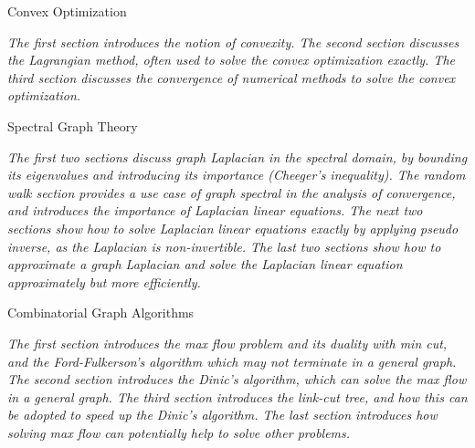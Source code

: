 \documentclass[11pt,landscape,a4paper]{article}
\newcommand{\HEADER}[1]{\begin{tcolorbox}
    \centering
    #1
\end{tcolorbox}}
\begin{document}
\small
\begin{multicols*}{3}


\HEADER{Convex Optimization}

\emph{The first section introduces the notion of convexity. The second section discusses the Lagrangian method, often used to solve the convex optimization exactly. The third section discusses the convergence of numerical methods to solve the convex optimization.}










\HEADER{Spectral Graph Theory}

\emph{The first two sections discuss graph Laplacian in the spectral domain, by bounding its eigenvalues and introducing its importance (Cheeger's inequality). The random walk section provides a use case of graph spectral in the analysis of convergence, and introduces the importance of Laplacian linear equations. The next two sections show how to solve Laplacian linear equations exactly by applying pseudo inverse, as the Laplacian is non-invertible. The last two sections show how to approximate a graph Laplacian and solve the Laplacian linear equation approximately but more efficiently.}
















\HEADER{Combinatorial Graph Algorithms}

\emph{The first section introduces the max flow problem and its duality with min cut, and the Ford-Fulkerson's algorithm which may not terminate in a general graph. The second section introduces the Dinic's algorithm, which can solve the max flow in a general graph. The third section introduces the link-cut tree, and how this can be adopted to speed up the Dinic's algorithm. The last section introduces how solving max flow can potentially help to solve other problems.}










\end{multicols*}
\end{document}
